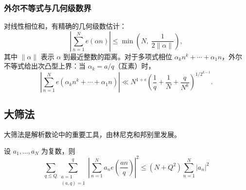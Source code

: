 \subsubsection{外尔不等式与几何级数界}

对线性相位和，有精确的几何级数估计：
\begin{equation}
    \left| \sum_{n=1}^N e(\alpha n) \right| \le \min\!\left(N,\ \frac{1}{2\|\alpha\|}\right),
\end{equation}
其中 $\|\alpha\|$ 表示 $\alpha$ 到最近整数的距离。对于多项式相位 $\alpha_k n^k + \cdots + \alpha_1 n$，外尔不等式给出次凸型上界：当 $\alpha_k = a/q$（互素）时，
\begin{equation}
    \left| \sum_{n=1}^N e(\alpha_k n^k + \cdots + \alpha_1 n) \right| \ll N^{1+\epsilon} \left( \frac{1}{q} + \frac{1}{N} + \frac{q}{N^k} \right)^{1/2^{k-1}}.
\end{equation}

\subsection{大筛法}

大筛法是解析数论中的重要工具，由林尼克和邦别里发展\cite{iwaniec2004analytic}。

\begin{theorem}[大筛法不等式]
    设 $a_1, \ldots, a_N$ 为复数，则
    \begin{equation}
        \sum_{q \leq Q} \sum_{\substack{a=1 \\ (a,q)=1}}^q \left| \sum_{n=1}^N a_n e\left(\frac{an}{q}\right) \right|^2 \leq (N + Q^2) \sum_{n=1}^N |a_n|^2
    \end{equation}
\end{theorem}
